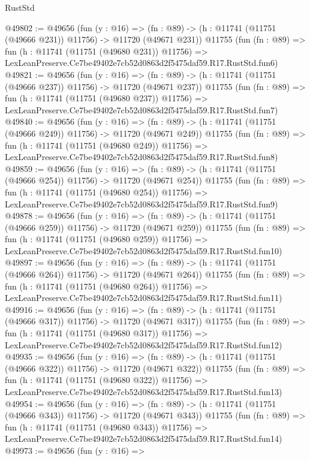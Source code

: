 \begin{lexlean}{RustStd}
\begin{coremodule}
@49802 := @49656
    (fun (y : @16) =>
    (fn : @89) -> (h : @11741 (@11751 (@49666 @231)) @11756) -> @11720 (@49671 @231))
    @11755
    (fun (fn : @89) =>
    fun (h : @11741 (@11751 (@49680 @231)) @11756) =>
    LexLeanPreserve.Ce7be49402e7cb52d0863d2f5475daf59.R17.RustStd.fun6)
@49821 := @49656
    (fun (y : @16) =>
    (fn : @89) -> (h : @11741 (@11751 (@49666 @237)) @11756) -> @11720 (@49671 @237))
    @11755
    (fun (fn : @89) =>
    fun (h : @11741 (@11751 (@49680 @237)) @11756) =>
    LexLeanPreserve.Ce7be49402e7cb52d0863d2f5475daf59.R17.RustStd.fun7)
@49840 := @49656
    (fun (y : @16) =>
    (fn : @89) -> (h : @11741 (@11751 (@49666 @249)) @11756) -> @11720 (@49671 @249))
    @11755
    (fun (fn : @89) =>
    fun (h : @11741 (@11751 (@49680 @249)) @11756) =>
    LexLeanPreserve.Ce7be49402e7cb52d0863d2f5475daf59.R17.RustStd.fun8)
@49859 := @49656
    (fun (y : @16) =>
    (fn : @89) -> (h : @11741 (@11751 (@49666 @254)) @11756) -> @11720 (@49671 @254))
    @11755
    (fun (fn : @89) =>
    fun (h : @11741 (@11751 (@49680 @254)) @11756) =>
    LexLeanPreserve.Ce7be49402e7cb52d0863d2f5475daf59.R17.RustStd.fun9)
@49878 := @49656
    (fun (y : @16) =>
    (fn : @89) -> (h : @11741 (@11751 (@49666 @259)) @11756) -> @11720 (@49671 @259))
    @11755
    (fun (fn : @89) =>
    fun (h : @11741 (@11751 (@49680 @259)) @11756) =>
    LexLeanPreserve.Ce7be49402e7cb52d0863d2f5475daf59.R17.RustStd.fun10)
@49897 := @49656
    (fun (y : @16) =>
    (fn : @89) -> (h : @11741 (@11751 (@49666 @264)) @11756) -> @11720 (@49671 @264))
    @11755
    (fun (fn : @89) =>
    fun (h : @11741 (@11751 (@49680 @264)) @11756) =>
    LexLeanPreserve.Ce7be49402e7cb52d0863d2f5475daf59.R17.RustStd.fun11)
@49916 := @49656
    (fun (y : @16) =>
    (fn : @89) -> (h : @11741 (@11751 (@49666 @317)) @11756) -> @11720 (@49671 @317))
    @11755
    (fun (fn : @89) =>
    fun (h : @11741 (@11751 (@49680 @317)) @11756) =>
    LexLeanPreserve.Ce7be49402e7cb52d0863d2f5475daf59.R17.RustStd.fun12)
@49935 := @49656
    (fun (y : @16) =>
    (fn : @89) -> (h : @11741 (@11751 (@49666 @322)) @11756) -> @11720 (@49671 @322))
    @11755
    (fun (fn : @89) =>
    fun (h : @11741 (@11751 (@49680 @322)) @11756) =>
    LexLeanPreserve.Ce7be49402e7cb52d0863d2f5475daf59.R17.RustStd.fun13)
@49954 := @49656
    (fun (y : @16) =>
    (fn : @89) -> (h : @11741 (@11751 (@49666 @343)) @11756) -> @11720 (@49671 @343))
    @11755
    (fun (fn : @89) =>
    fun (h : @11741 (@11751 (@49680 @343)) @11756) =>
    LexLeanPreserve.Ce7be49402e7cb52d0863d2f5475daf59.R17.RustStd.fun14)
@49973 := @49656
    (fun (y : @16) =>

\end{coremodule}
\end{lexlean}
